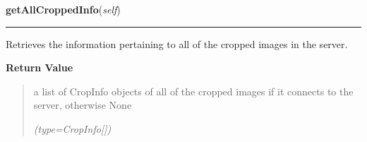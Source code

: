     \vspace{0.5ex}

\hspace{.8\funcindent}\begin{boxedminipage}{\funcwidth}

    \raggedright \textbf{getAllCroppedInfo}(\textit{self})

    \vspace{-1.5ex}

    \rule{\textwidth}{0.5\fboxrule}
\setlength{\parskip}{2ex}
    Retrieves the information pertaining to all of the cropped images in 
    the server.

\setlength{\parskip}{1ex}
      \textbf{Return Value}
    \vspace{-1ex}

      \begin{quote}
      a list of CropInfo objects of all of the cropped images if it 
      connects to the server, otherwise None

      {\it (type=CropInfo[])}

      \end{quote}

    \end{boxedminipage}

    \label{client_rest:ImagingInterface:imageToBytes}

    \vspace{0.5ex}

